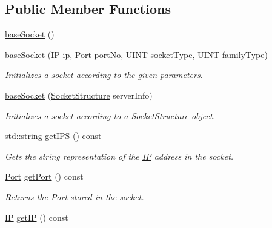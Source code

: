 \subsection*{Public Member Functions}
\begin{DoxyCompactItemize}
\item 
\hyperlink{class_communication_1_1base_socket_ae213be9a97f353585668e1115fc5273a}{base\+Socket} ()
\item 
\hyperlink{class_communication_1_1base_socket_ac2d2df47f79b5a60b6ca2dd8af31d40b}{base\+Socket} (\hyperlink{class_communication_1_1_i_p}{I\+P} ip, \hyperlink{class_communication_1_1_port}{Port} port\+No, \hyperlink{typedefs_8h_a2e2c38961834f28c06e17e074eb00bc7}{U\+I\+N\+T} socket\+Type, \hyperlink{typedefs_8h_a2e2c38961834f28c06e17e074eb00bc7}{U\+I\+N\+T} family\+Type)
\begin{DoxyCompactList}\small\item\em Initializes a socket according to the given parameters. \end{DoxyCompactList}\item 
\hyperlink{class_communication_1_1base_socket_a18e4ac664428ff983a3e89c32ecee806}{base\+Socket} (\hyperlink{class_communication_1_1_socket_structure}{Socket\+Structure} server\+Info)
\begin{DoxyCompactList}\small\item\em Initializes a socket according to a \hyperlink{class_communication_1_1_socket_structure}{Socket\+Structure} object. \end{DoxyCompactList}\item 
std\+::string \hyperlink{class_communication_1_1base_socket_afc772059faa2fc0776aa3fc5bb846c0b}{get\+I\+P\+S} () const 
\begin{DoxyCompactList}\small\item\em Gets the string representation of the \hyperlink{class_communication_1_1_i_p}{I\+P} address in the socket. \end{DoxyCompactList}\item 
\hyperlink{class_communication_1_1_port}{Port} \hyperlink{class_communication_1_1base_socket_a26cb031a880597f5323d720f4a295971}{get\+Port} () const 
\begin{DoxyCompactList}\small\item\em Returns the \hyperlink{class_communication_1_1_port}{Port} stored in the socket. \end{DoxyCompactList}\item 
\hyperlink{class_communication_1_1_i_p}{I\+P} \hyperlink{class_communication_1_1base_socket_ab2744d91831fa4cc36b065829b34a558}{get\+I\+P} () const 

\end{DoxyCompactItemize}
